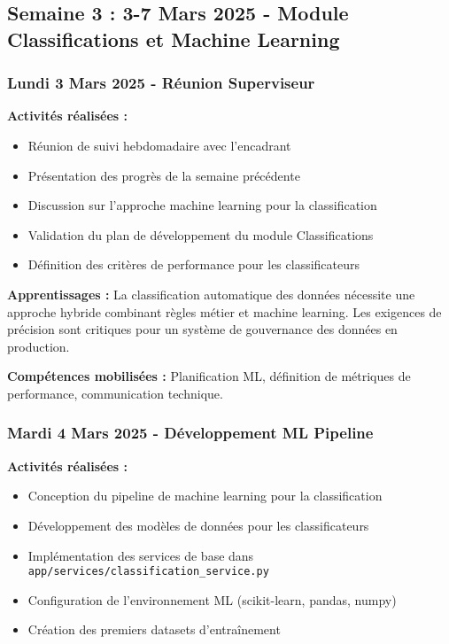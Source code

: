 \subsection{Semaine 3 : 3-7 Mars 2025 - Module Classifications et Machine Learning}

\subsubsection{Lundi 3 Mars 2025 - Réunion Superviseur}

\textbf{Activités réalisées :}
\begin{itemize}
    \item Réunion de suivi hebdomadaire avec l'encadrant
    \item Présentation des progrès de la semaine précédente
    \item Discussion sur l'approche machine learning pour la classification
    \item Validation du plan de développement du module Classifications
    \item Définition des critères de performance pour les classificateurs
\end{itemize}

\textbf{Apprentissages :}
La classification automatique des données nécessite une approche hybride combinant règles métier et machine learning. Les exigences de précision sont critiques pour un système de gouvernance des données en production.

\textbf{Compétences mobilisées :}
Planification ML, définition de métriques de performance, communication technique.

\subsubsection{Mardi 4 Mars 2025 - Développement ML Pipeline}

\textbf{Activités réalisées :}
\begin{itemize}
    \item Conception du pipeline de machine learning pour la classification
    \item Développement des modèles de données pour les classificateurs
    \item Implémentation des services de base dans \texttt{app/services/classification\_service.py}
    \item Configuration de l'environnement ML (scikit-learn, pandas, numpy)
    \item Création des premiers datasets d'entraînement
\end{itemize}


